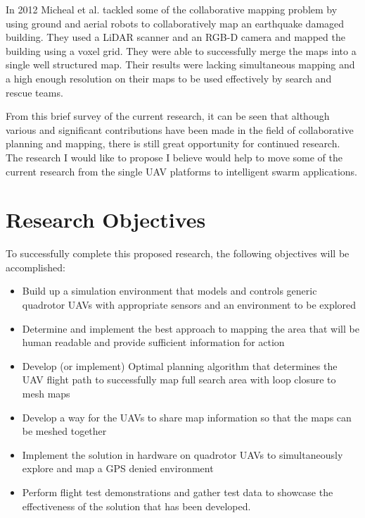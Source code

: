 \documentclass[12pt, letterpaper]{article}
\begin{document}
In 2012 Micheal et al. \cite{Michael2012} tackled some of the collaborative mapping problem by using ground and aerial robots to collaboratively map an earthquake damaged building. They used a LiDAR scanner and an RGB-D camera and mapped the building using a voxel grid. They were able to successfully merge the maps into a single well structured map. Their results were lacking simultaneous mapping and a high enough resolution on their maps to be used effectively by search and rescue teams.   

From this brief survey of the current research, it can be seen that although various and significant contributions have been made in the field of collaborative planning and mapping, there is still great opportunity for continued research.  The research I would like to propose I believe would help to move some of the current research from the single UAV platforms to intelligent swarm applications.

\section{Research Objectives}

To successfully complete this proposed research, the following objectives will be accomplished:


\begin{itemize}

	\item Build up a simulation environment that models and controls generic quadrotor UAVs with appropriate sensors and an environment to be explored
	
	\item Determine and implement the best approach to mapping the area that will be human readable and provide sufficient information for action

	\item Develop (or implement) Optimal planning algorithm that determines the UAV flight path to successfully map full search area with loop closure to mesh maps  
	
	\item Develop a way for the UAVs to share map information so that the maps can be meshed together 

	\item Implement the solution in hardware on quadrotor UAVs to simultaneously explore and map a GPS denied environment
	
	\item Perform flight test demonstrations and gather test data to showcase the effectiveness of the solution that has been developed.

\end{itemize}
\end{document}
